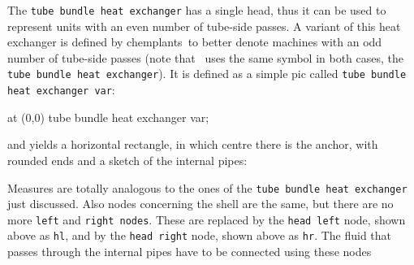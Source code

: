 \documentclass[12pt]{article}						%
\newcommand*{\ac}[1]{%
		\textsmaller{#1}%
	}
\newcommand*{\chpn}[1]{\texttt{#1}}				%
\newcommand*{\chpp}[1]{\texttt{#1}}				%
\newcommand*{\chemplants}{chemplants}
\newcommand*{\UNICHIM}{\ac{UNICHIM}}
\begin{document}
The \chpp{tube bundle heat exchanger} has a single head, thus it can be used to
represent units with an even number of tube-side passes. A variant of this heat
exchanger is defined by \chemplants\ to better denote machines with an odd number
of tube-side passes (note that \UNICHIM\ uses the same symbol in both cases, the
\chpp{tube bundle heat exchanger}). It is defined as a simple pic called
\chpp{tube bundle heat exchanger var}:
\begin{chpcode}
	\pic at (0,0) {tube bundle heat exchanger var};
\end{chpcode}
and yields a horizontal rectangle, in which centre there is the anchor, with
rounded ends and a sketch of the internal pipes:
\begin{center}
\end{center}

Measures are totally analogous to the ones of the
\chpp{tube bundle heat exchanger} just discussed. Also nodes concerning the shell
are the same, but there are no more \chpn{left} and \chpn{right nodes}. These are
replaced by the \chpn{head left} node, shown above as \chpn{hl}, and by the
\chpn{head right} node, shown above as \chpn{hr}. The fluid that passes through
the internal pipes have to be connected using these nodes
\end{document}
